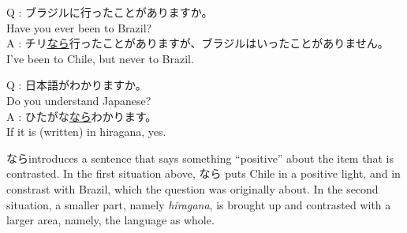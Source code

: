 \documentclass[notoc,notitlepage]{tufte-book}
\begin{document}
\begin{eg}[Situation 1]\label{eg:nara_situation_1}
\noindent    Q : ブラジルに行ったことがありますか。 \\
\noindent \quad\enspace Have you ever been to Brazil? \\
\noindent    A : チリ\underline{なら}行ったことがありますが、ブラジルはいったことがありません。 \\
\noindent \quad\enspace I've been to Chile, but never to Brazil. 
\end{eg}

\begin{eg}[Situation 2]\label{eg:nara_situation_2}
\noindent Q : 日本語がわかりますか。\\
\noindent \quad\enspace Do you understand Japanese? \\
\noindent A : ひたがな\underline{なら}わかります。\\
\noindent \quad\enspace If it is (written) in hiragana, yes.
\end{eg}

\begin{note}
  ならintroduces a sentence that says something ``positive'' about the item that is contrasted. In the first situation above, なら puts Chile in a positive light, and in constrast with Brazil, which the question was originally about. In the second situation, a smaller part, namely \textit{hiragana}, is brought up and contrasted with a larger area, namely, the language as  whole. 
\end{note}
\end{document}
